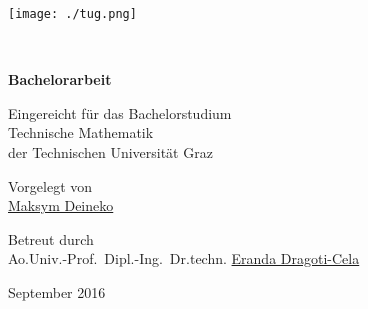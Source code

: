 \documentclass[titlepage]{scrartcl}
\begin{document}
\thispagestyle{empty}


\hfill\texttt{[image: ./tug.png]}

\begin{center}
\vspace{2.4cm}

{}
\\
\vspace{0.52cm}
{}

\vspace{1.65cm}
\vspace{1.6cm}

{\bfseries Bachelorarbeit}

\vspace{1.6cm}
Eingereicht für das
Bachelorstudium
\\
Technische Mathematik
\\
der Technischen Universität Graz

\vspace{0.8cm}
Vorgelegt von
\\
\href{mailto:deineko@student.tugraz.at}{Maksym Deineko}

\vspace{0.8cm}
Betreut durch
\\
Ao.Univ.-Prof.\ Dipl.-Ing.\ Dr.techn.
\href{mailto:cela@math.tugraz.at}{Eranda Dragoti-Cela}

\vspace{1.7cm}
September 2016

\end{center}
\end{document}

